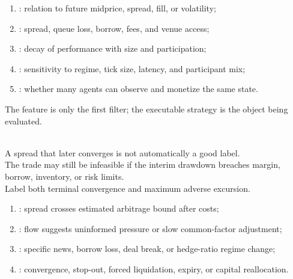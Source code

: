 \begin{taxonomy} 
\begin{enumerate}[label=\roman*.]
\setlength{\itemsep}{0pt}
\item {}: relation to future midprice, spread, fill, or volatility;
\item {}: spread, queue loss, borrow, fees, and venue access;
\item {}: decay of performance with size and participation;
\item {}: sensitivity to regime, tick size, latency, and participant mix;
\item {}: whether many agents can observe and monetize the same state.
\end{enumerate}
The feature is only the first filter; the executable strategy is the object being evaluated.
\end{taxonomy}

\begin{principle} \\
A spread that later converges is not automatically a good label.\\
The trade may still be infeasible if the interim drawdown breaches margin, borrow, inventory, or risk limits.\\
Label both terminal convergence and maximum adverse excursion.
\end{principle}

\begin{taxonomy} 
\begin{enumerate}[label=\roman*.]
\setlength{\itemsep}{0pt}
\item {}: spread crosses estimated arbitrage bound after costs;
\item {}: flow suggests uninformed pressure or slow common-factor adjustment;
\item {}: specific news, borrow loss, deal break, or hedge-ratio regime change;
\item {}: convergence, stop-out, forced liquidation, expiry, or capital reallocation.
\end{enumerate}
\end{taxonomy}
